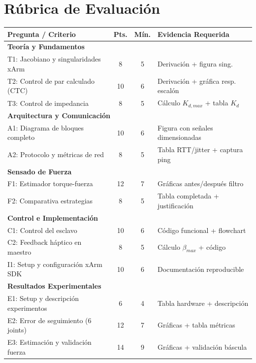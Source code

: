 \documentclass[journal,10pt,twoside]{IEEEtran}
\begin{document}
\section{Rúbrica de Evaluación}
\label{app:rubrica}

\begin{center}
\small
\begin{tabular}{p{}ccp{}}
  \toprule
  \textbf{Pregunta / Criterio} & \textbf{Pts.} & \textbf{Mín.} & \textbf{Evidencia Requerida} \\
  \midrule
  \multicolumn{4}{l}{\textbf{Teoría y Fundamentos}} \\
  T1: Jacobiano y singularidades xArm & 8 & 5 & Derivación + figura sing. \\
  T2: Control de par calculado (CTC)  & 10 & 6 & Derivación + gráfica resp. escalón \\
  T3: Control de impedancia           & 8 & 5 & Cálculo $K_{d,max}$ + tabla $K_d$ \\
  \midrule
  \multicolumn{4}{l}{\textbf{Arquitectura y Comunicación}} \\
  A1: Diagrama de bloques completo    & 10 & 6 & Figura con señales dimensionadas \\
  A2: Protocolo y métricas de red     & 8 & 5 & Tabla RTT/jitter + captura ping \\
  \midrule
  \multicolumn{4}{l}{\textbf{Sensado de Fuerza}} \\
  F1: Estimador torque-fuerza         & 12 & 7 & Gráficas antes/después filtro \\
  F2: Comparativa estrategias         & 8 & 5 & Tabla completada + justificación \\
  \midrule
  \multicolumn{4}{l}{\textbf{Control e Implementación}} \\
  C1: Control del esclavo             & 10 & 6 & Código funcional + flowchart \\
  C2: Feedback háptico en maestro     & 8 & 5 & Cálculo $\beta_{max}$ + código \\
  I1: Setup y configuración xArm SDK  & 10 & 6 & Documentación reproducible \\
  \midrule
  \multicolumn{4}{l}{\textbf{Resultados Experimentales}} \\
  E1: Setup y descripción experimentos & 6 & 4 & Tabla hardware + descripción \\
  E2: Error de seguimiento (6 joints)  & 12 & 7 & Gráficas + tabla métricas \\
  E3: Estimación y validación fuerza   & 14 & 9 & Gráficas + validación báscula \\

\end{tabular}
\end{center}
\end{document}
